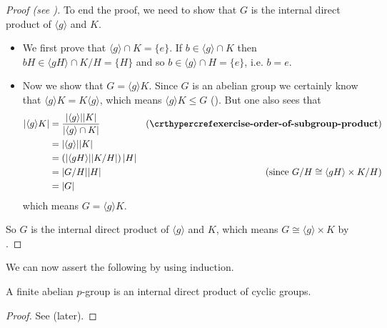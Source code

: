 \begin{proof}[Proof (see {\cite[Lemma 13.9]{judson_beezer_2022}})]
    To end the proof, we need to show that $G$ is the internal direct product of $\langle g\rangle$ and $K$.
    \begin{itemize}
        \item We first prove that $\langle g\rangle \cap K = \{e\}$. If $b \in \langle g\rangle \cap K$ then $bH \in \langle gH\rangle \cap K/H = \{H\}$ and so $b \in \langle g \rangle \cap H = \{e\}$, i.e. $b = e$.

        \item Now we show that $G = \langle g\rangle K$. Since $G$ is an abelian group we certainly know that $\langle g\rangle K = K\langle g\rangle$, which means $\langle g\rangle K \leq G$ (). But one also sees that
        \begin{align*}
            |\langle g\rangle K| &= \frac{|\langle g\rangle||K|}{|\langle g\rangle \cap K|} & (\myref{exercise-order-of-subgroup-product})\\
            &= |\langle g\rangle||K|\\
            &= \left(|\langle gH \rangle||K/H|\right)|H|\\
            &= |G/H||H| & (\text{since }G/H \cong \langle gH \rangle \times K/H)\\
            &= |G|
        \end{align*}
        which means $G = \langle g\rangle K$.
    \end{itemize}
    So $G$ is the internal direct product of $\langle g\rangle$ and $K$, which means $G \cong \langle g\rangle \times K$ by .
\end{proof}

We can now assert the following by using induction.
\begin{lemma}\label{lemma-fundamental-theorem-of-finite-abelian-groups-3}
    A finite abelian $p$-group is an internal direct product of cyclic groups.
\end{lemma}
\begin{proof}
    See  (later).
\end{proof}

